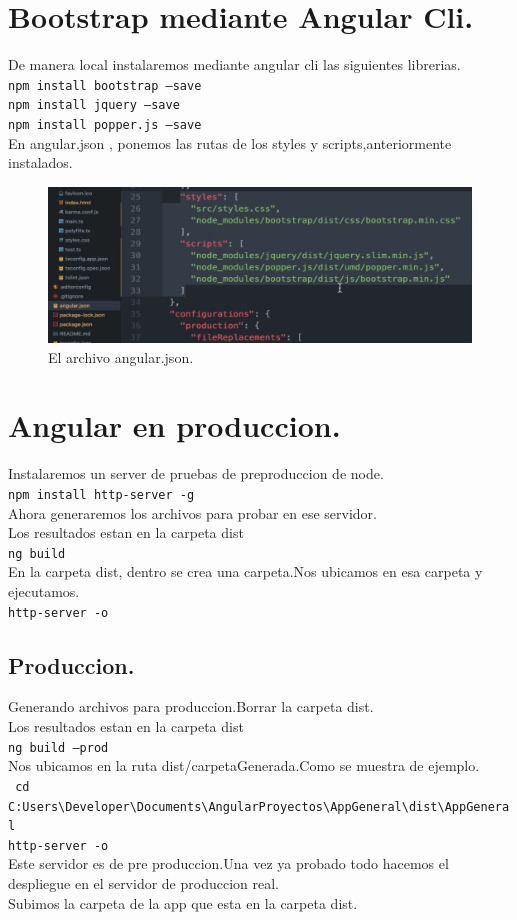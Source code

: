 \section{Bootstrap mediante Angular Cli.}
De manera local instalaremos mediante angular cli las siguientes librerias.\\
 \texttt{npm install bootstrap --save}\\
 \texttt{npm install jquery --save}\\
 \texttt{npm install popper.js --save}\\
 En angular.json , ponemos las rutas de los styles y scripts,anteriormente instalados.
 \begin{figure}[H] %
 	\centering %
 	\includegraphics[scale=0.5]{images/c3_5.jpg}
 	\caption{El archivo angular.json.}
 \end{figure}

\section{Angular en produccion.}
Instalaremos un server de pruebas de preproduccion de node.\\
 \texttt{npm install http-server -g}\\
 Ahora generaremos los archivos para probar en ese servidor.\\
Los resultados estan en la carpeta dist\\
 \texttt{ng build}\\
  En la carpeta dist, dentro se crea una carpeta.Nos ubicamos en esa carpeta y  ejecutamos.\\
 \texttt{http-server -o}\\
 \subsection{ Produccion.}
 Generando archivos para produccion.Borrar  la
 carpeta dist.\\Los resultados estan en la carpeta dist\\
 \texttt{ng build --prod}\\
 Nos ubicamos en la ruta dist/carpetaGenerada.Como se muestra de ejemplo.\\
  \texttt{ cd C:Users\textbackslash{}Developer\textbackslash{}Documents\textbackslash{}AngularProyectos\textbackslash{}AppGeneral\textbackslash{}dist\textbackslash{}AppGeneral}\\
  \texttt{http-server -o}\\
  Este servidor es de pre produccion.Una vez ya probado todo hacemos el despliegue en el servidor de produccion real.\\Subimos la carpeta de la app que esta en la carpeta  dist.\\
